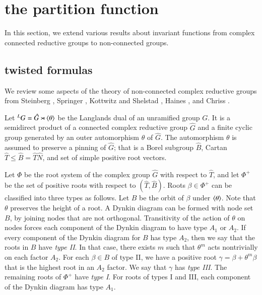 \newpage
\section{the partition function}


In this section, we extend various results about invariant functions from
complex connected reductive groups to non-connected groups.



\subsection{twisted formulas}

We review some aspects of the  theory of non-connected complex reductive groups from
Steinberg \cite{steinberg1968endomorphisms},  Springer \cite{springer2010linear},
Kottwitz and Shelstad \cite{kottwitz1999foundations}, 
Haines \cite{haines2016dualities}, and
 Chriss \cite{chriss}.





Let ${}^LG = \hat G \rtimes \langle{\theta}\rangle$ be the Langlands dual of an unramified group $G$.
It is a semidirect product of a connected complex reductive group $\hat G$ and a finite cyclic group
generated by an outer automorphism $\theta$ of $\hat G$.  The automorphism $\theta$ is assumed
to preserve a pinning of $\hat G$; that is a Borel subgroup $\hat B$, Cartan $\hat T\le \hat B=\hat T\hat N$, and
set of simple positive root vectors.  

Let $\Phi$ be the root system of the complex group $\hat G$ with respect to $\hat T$, and let
$\Phi^+$ be the set of positive roots with respect to $(\hat T,\hat B)$.
  Roots $\beta\in\Phi^+$ can be classified into three types as follows.  Let $B$ be the orbit of $\beta$ under
$\langle{\theta}\rangle$.  Note that $\theta$ preserves the height of a root.
A Dynkin diagram can be formed with node set $B$, by joining nodes that are not orthogonal.  
Transitivity of the action of $\theta$ on nodes forces each component of the Dynkin diagram to have type $A_1$
or $A_2$.  If every component of the Dynkin diagram for $B$  has type $A_2$, then we say that the roots in $B$
have {\it type II}.  In that case, there exists $m$ such that  $\theta^m$ acts nontrivially
on each factor $A_2$.   For each $\beta\in B$ of type II, we have a positive root $\gamma = \beta+\theta^m\beta$ that
is the highest root in an $A_2$ factor.  We say that $\gamma$ has {\it type III}.
The remaining roots of $\Phi^+$ have {\it type I}.  For roots of
types I and III, each component of the Dynkin diagram has type $A_1$.

